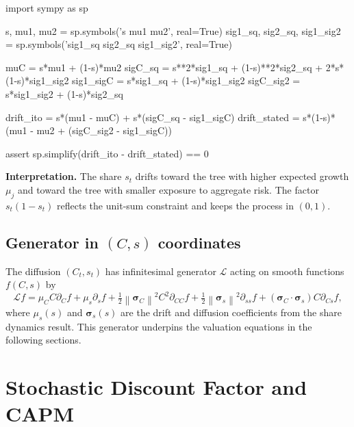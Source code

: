 ﻿\documentclass[11pt,letterpaper,oneside]{article}
\numberwithin{equation}{section}
\newcommand{\1}{\mathbf{1}}
\newcommand{\norm}[1]{\left\lVert #1\right\rVert}
\begin{document}
\begin{sympycheck}[title={Verification: Share dynamics}]
\begin{pyconsole}
import sympy as sp

s, mu1, mu2 = sp.symbols('s mu1 mu2', real=True)
sig1_sq, sig2_sq, sig1_sig2 = sp.symbols('sig1_sq sig2_sq sig1_sig2', real=True)

muC = s*mu1 + (1-s)*mu2
sigC_sq = s**2*sig1_sq + (1-s)**2*sig2_sq + 2*s*(1-s)*sig1_sig2
sig1_sigC = s*sig1_sq + (1-s)*sig1_sig2
sigC_sig2 = s*sig1_sig2 + (1-s)*sig2_sq

drift_ito = s*(mu1 - muC) + s*(sigC_sq - sig1_sigC)
drift_stated = s*(1-s)*(mu1 - mu2 + (sigC_sig2 - sig1_sigC))

assert sp.simplify(drift_ito - drift_stated) == 0
\end{pyconsole}
\end{sympycheck}

\begin{tcolorbox}[didacticstyle]
\textbf{Interpretation.} The share $s_t$ drifts toward the tree with higher expected growth $\mu_j$ and toward the tree with smaller exposure to aggregate risk. The factor $s_t(1-s_t)$ reflects the unit-sum constraint and keeps the process in $(0,1)$.
\end{tcolorbox}
\subsection{Generator in $(C,s)$ coordinates}
The diffusion $(C_t,s_t)$ has infinitesimal generator $\mathcal{L}$ acting on smooth functions $f(C,s)$ by
\[
  \mathcal{L}f = \mu_C C \partial_C f + \mu_s \partial_s f + \tfrac12 \norm{\bm{\sigma}_C}^2 C^2 \partial_{CC} f + \tfrac12 \norm{\bm{\sigma}_s}^2 \partial_{ss} f + (\bm{\sigma}_C\cdot\bm{\sigma}_s) C \partial_{Cs} f,
\]
where $\mu_s(s)$ and $\bm{\sigma}_s(s)$ are the drift and diffusion coefficients from the share dynamics result. This generator underpins the valuation equations in the following sections.

\section{Stochastic Discount Factor and CAPM}\label{sec:sdf}
\end{document}
